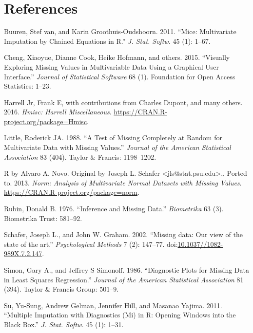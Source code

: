 \documentclass[]{article}
\begin{document}
\section*{References}\label{references}

\hypertarget{refs}{}
\hypertarget{ref-mice}{}
Buuren, Stef van, and Karin Groothuis-Oudshoorn. 2011. ``Mice:
Multivariate Imputation by Chained Equations in R.'' \emph{J. Stat.
Softw.} 45 (1): 1--67.

\hypertarget{ref-cheng2015}{}
Cheng, Xiaoyue, Dianne Cook, Heike Hofmann, and others. 2015. ``Visually
Exploring Missing Values in Multivariable Data Using a Graphical User
Interface.'' \emph{Journal of Statistical Software} 68 (1). Foundation
for Open Access Statistics: 1--23.

\hypertarget{ref-Hmisc}{}
Harrell Jr, Frank E, with contributions from Charles Dupont, and many
others. 2016. \emph{Hmisc: Harrell Miscellaneous}.
\url{https://CRAN.R-project.org/package=Hmisc}.

\hypertarget{ref-Little1988}{}
Little, Roderick JA. 1988. ``A Test of Missing Completely at Random for
Multivariate Data with Missing Values.'' \emph{Journal of the American
Statistical Association} 83 (404). Taylor \& Francis: 1198--1202.

\hypertarget{ref-norm}{}
R by Alvaro A. Novo. Original by Joseph L. Schafer
\textless{}jls@stat.psu.edu\textgreater{}., Ported to. 2013. \emph{Norm:
Analysis of Multivariate Normal Datasets with Missing Values}.
\url{https://CRAN.R-project.org/package=norm}.

\hypertarget{ref-Rubin1976}{}
Rubin, Donald B. 1976. ``Inference and Missing Data.'' \emph{Biometrika}
63 (3). Biometrika Trust: 581--92.

\hypertarget{ref-Schafer2002}{}
Schafer, Joseph L., and John W. Graham. 2002. ``Missing data: Our view
of the state of the art.'' \emph{Psychological Methods} 7 (2): 147--77.
doi:\href{https://doi.org/10.1037//1082-989X.7.2.147}{10.1037//1082-989X.7.2.147}.

\hypertarget{ref-simon-simonoff}{}
Simon, Gary A., and Jeffrey S Simonoff. 1986. ``Diagnostic Plots for
Missing Data in Least Squares Regression.'' \emph{Journal of the
American Statistical Association} 81 (394). Taylor \& Francis Group:
501--9.

\hypertarget{ref-mi}{}
Su, Yu-Sung, Andrew Gelman, Jennifer Hill, and Masanao Yajima. 2011.
``Multiple Imputation with Diagnostics (Mi) in R: Opening Windows into
the Black Box.'' \emph{J. Stat. Softw.} 45 (1): 1--31.
\end{document}
